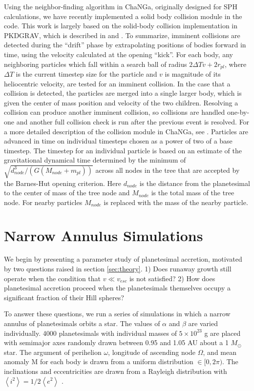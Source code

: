 \documentclass[twocolumn]{aastex63}
\begin{document}
Using the neighbor-finding algorithm in {\sc ChaNGa}, originally
designed for SPH calculations, we have recently implemented a solid
body collision module in the code.  This work is largely based on the
solid-body collision implementation in {\sc PKDGRAV}, which is
described in \citet{richardson94} and \citet{richardson00}. To
summarize, imminent collisions are detected during the ``drift'' phase
by extrapolating positions of bodies forward in time, using the
velocity calculated at the opening ``kick''. For each body, any
neighboring particles which fall within a search ball of radius
$2 \Delta T v + 2 r_{pl}$, where $\Delta T$ is the current timestep size
for the particle and $v$ is magnitude of its heliocentric velocity,
 are tested for an imminent collision. In the case that
a collision is detected, the particles are merged into a single larger
body, which is given the center of mass position and velocity of the
two children. Resolving a collision can produce another imminent
collision, so collisions are handled one-by-one and another full
collision check is run after the previous event is resolved. For a
more detailed description of the collision module in {\sc ChaNGa}, see
\citep{wallace19}.
Particles are advanced in time on individual timesteps chosen as a
power of two of a base timestep.  The timestep for an individual
particle is based on an estimate of the gravitational dynamical time
determined by the minimum of $\sqrt{d_{node}^3/(G(M_{node} + m_{pl}))}$
across all nodes in the tree that are accepted by the Barnes-Hut
opening criterion.  Here $d_{node}$ is the distance from the
planetesimal to the center of mass of the tree node and $M_{node}$ is
the total mass of the tree node.  For nearby particles $M_{node}$ is
replaced with the mass of the nearby particle.

\section{Narrow Annulus Simulations}\label{sec:narrow}

We begin by presenting a parameter study of planetesimal accretion,
motivated by two questions raised in section \ref{sec:theory}. 1) Does
runaway growth still operate when the condition that $v \ll v_{esc}$
is not satisfied? 2) How does planetesimal accretion proceed when the planetesimals themselves occupy a significant fraction of their Hill spheres?

To answer these questions, we run a series of simulations in which a
narrow annulus of planetesimals orbits a star. The values of $\alpha$
and $\beta$ are varied individually. 4000 planetesimals with
individual masses of $5 \times 10^{23}$ g are placed with semimajor
axes randomly drawn between 0.95 and 1.05 AU about a 1 $M_{\odot}$
star. The argument of perihelion $\omega$, longitude of ascending node
$\Omega$, and mean anomaly M for each body is drawn from a uniform
distribution $\in [0, 2 \pi)$. The inclinations and eccentricities are drawn
from a Rayleigh distribution with
$\left< i^{2} \right> = 1/2 \left< e^{2} \right>$ \citep{ida93a}.
\end{document}
